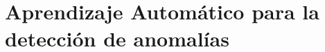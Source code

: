 
\chapter{Aprendizaje Autom\'{a}tico para la detecci\'{o}n de anomal\'{i}as}
\label{Capitulo 4}




%